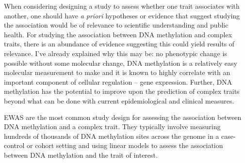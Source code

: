 \documentclass[11pt,oneside]{bristolthesis}
\begin{document}
When considering designing a study to assess whether one trait associates with another, one should have \emph{a priori} hypotheses or evidence that suggest studying the association would be of relevance to scientific understanding and public health. For studying the association between DNA methylation and complex traits, there is an abundance of evidence suggesting this could yield results of relevance. I've already explained why this may be: no phenotypic change is possible without some molecular change, DNA methylation is a relatively easy molecular measurement to make and it is known to highly correlate with an important component of cellular regulation -- gene expression. Further, DNA methylation has the potential to improve upon the prediction of complex traits beyond what can be done with current epidemiological and clinical measures.

EWAS are the most common study design for assessing the association between DNA methylation and a complex trait. They typically involve measuring hundreds of thousands of DNA methylation sites across the genome in a case-control or cohort setting and using linear models to assess the association between DNA methylation and the trait of interest.
\end{document}

